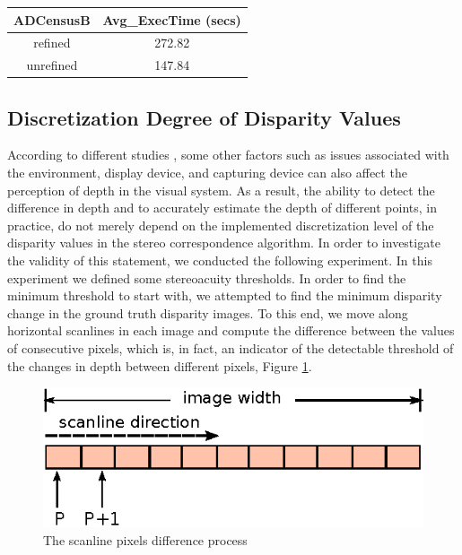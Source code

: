 \begin{minipage}{\linewidth}
\begin{center}
\label{tab:timerefNoref}
\begin{tabular}{|c|c|}
\hline
ADCensusB & Avg\_ExecTime (secs) \\ \hline
refined & 272.82 \\  \hline
unrefined & 147.84 \\ \hline
\end{tabular}
\end{center}
\end{minipage} \newline

\subsection{Discretization Degree of Disparity Values}
According to different studies \cite{dras96, kru10,azuma01}, some other factors such as issues associated with the environment, display device, and capturing device
can also affect the perception of depth in the visual system. As a result, the ability to detect the difference in depth and to accurately estimate the
depth of different points, in practice,
do not merely depend on the implemented discretization level of the disparity values in the stereo correspondence algorithm.
In order to investigate the validity of this statement, we conducted the following experiment. In this experiment we defined some stereoacuity thresholds. 
In order to find the minimum threshold to start with, we attempted to find the 
minimum disparity change in the ground truth disparity images. To this end, we move along horizontal scanlines in each image and 
compute the difference between the values of consecutive pixels, which is, in fact, an indicator of the detectable threshold of the changes in depth between
different pixels, Figure \ref{fig:scanline}. 

\begin{figure}[H]
\centering
\includegraphics{scanline}
\caption{The scanline pixels difference process}
\label{fig:scanline}
\end{figure} 


